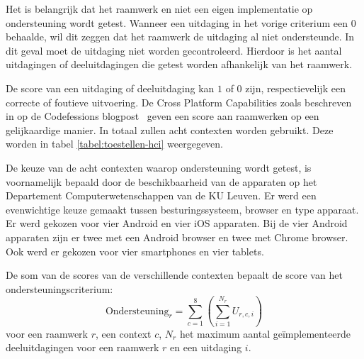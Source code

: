 Het is belangrijk dat het raamwerk en niet een eigen implementatie op ondersteuning wordt getest.
Wanneer een uitdaging in het vorige criterium een $0$ behaalde, wil dit zeggen dat het raamwerk de uitdaging al niet ondersteunde.
In dit geval moet de uitdaging niet worden gecontroleerd.
Hierdoor is het aantal uitdagingen of deeluitdagingen die getest worden afhankelijk van het raamwerk.


De score van een uitdaging of deeluitdaging kan $1$ of $0$ zijn, respectievelijk een correcte of foutieve uitvoering.
De Cross Platform Capabilities zoals beschreven in op de Codefessions blogpost~\cite{Sarrafi2012a} geven een score aan raamwerken op een gelijkaardige manier.
In totaal zullen acht contexten worden gebruikt.
Deze worden in tabel \ref{tabel:toestellen-hci} weergegeven.

 \begin{table}
 \centering
 \resizebox{\textwidth}{!} {
 }
 \caption{Acht contexten: apparaten met hun soort, lancering, besturingssysteem~(BS) en browser.}
 \label{tabel:toestellen-hci}
 \end{table}
 
De keuze van de acht contexten waarop ondersteuning wordt getest, is voornamelijk bepaald door de beschikbaarheid van de apparaten op het Departement Computerwetenschappen van de KU Leuven.
Er werd een evenwichtige keuze gemaakt tussen besturingssysteem,  browser en type apparaat.
Er werd gekozen voor vier Android en vier iOS apparaten.
Bij de vier Android apparaten zijn er twee met een Android browser en twee met Chrome browser.
Ook werd er gekozen voor vier smartphones en vier tablets.

De som van de scores van de verschillende contexten bepaalt de score van het ondersteuningscriterium:
\begin{equation}
  \text{Ondersteuning}_r = \sum_{c=1}^{8}{\left(\sum_{i=1}^{N_r}U_{r,c,i}\right)}
  \label{eq:ondersteuning}
\end{equation}
voor  een raamwerk $r$, een context $c$, $N_r$ het maximum aantal geïmplementeerde deeluitdagingen voor een raamwerk $r$ en een uitdaging $i$. 


